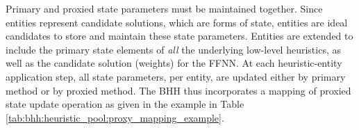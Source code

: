 Primary and proxied state parameters must be maintained together. Since entities represent candidate solutions, which are forms of state, entities are ideal candidates to store and maintain these state parameters. Entities are extended to include the primary state elements of \textit{all} the underlying low-level heuristics, as well as the candidate solution (weights) for the \acs{FFNN}. At each heuristic-entity application step, all state parameters, per entity, are updated either by primary method or by proxied method. The \acs{BHH} thus incorporates a mapping of proxied state update operation as given in the example in Table \ref{tab:bhh:heuristic_pool:proxy_mapping_example}.

\begin{table}[htbp]
      \centering
      \caption{An example of a mapping of proxied state update operation maintained by the \acs{BHH}.}
      \label{tab:bhh:heuristic_pool:proxy_mapping_example}%
      \par\bigskip
\end{table}%

